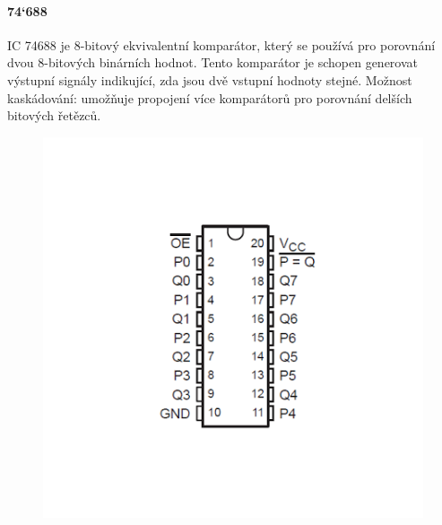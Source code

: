 \paragraph{74`688}
IC 74688 je 8-bitový ekvivalentní komparátor, který se používá pro porovnání dvou 8-bitových binárních hodnot. Tento komparátor je schopen generovat výstupní signály indikující, zda jsou dvě vstupní hodnoty stejné. Možnost kaskádování: umožňuje propojení více komparátorů pro porovnání delších bitových řetězců.
\begin{figure}[htbp]
\centering
\includegraphics[scale=0.3]{sections/3_pld_npld/images/74688.png}
\end{figure}
